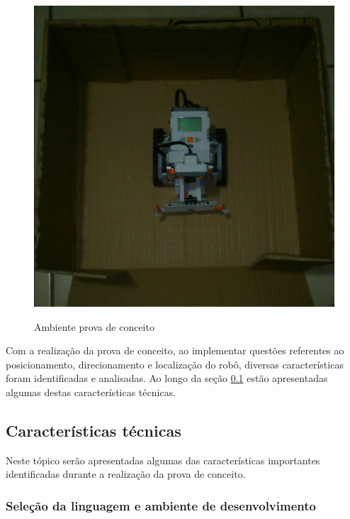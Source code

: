 		\begin{figure}[H]
			\centering
			\includegraphics[scale=0.4]{figuras/ambienteConceito.eps}
			\label{img:ambienteProva}
			\caption{Ambiente prova de conceito}
		\end{figure}

		Com a realização da prova de conceito, ao implementar questões referentes ao posicionamento, direcionamento e localização do robô, diversas características foram identificadas e analisadas. Ao longo da seção \ref{sub:características_técnicas} estão apresentadas algumas destas características técnicas.


	\subsection{Características técnicas} %
	\label{sub:características_técnicas}
	
		Neste tópico serão apresentadas algumas das características importantes identificadas durante a realização da prova de conceito.

		\subsubsection{Seleção da linguagem e ambiente de desenvolvimento}

